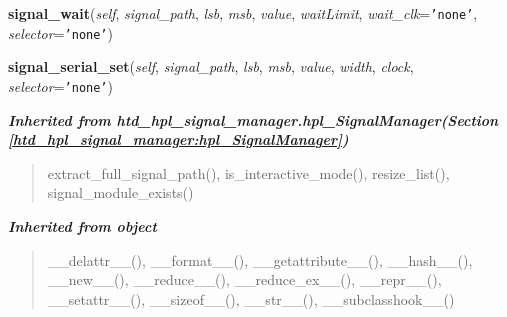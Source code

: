     \vspace{0.5ex}

\hspace{.8\funcindent}\begin{boxedminipage}{\funcwidth}

    \raggedright \textbf{signal\_wait}(\textit{self}, \textit{signal\_path}, \textit{lsb}, \textit{msb}, \textit{value}, \textit{waitLimit}, \textit{wait\_clk}={\tt \texttt{'}\texttt{none}\texttt{'}}, \textit{selector}={\tt \texttt{'}\texttt{none}\texttt{'}})

\setlength{\parskip}{2ex}
\setlength{\parskip}{1ex}
    \end{boxedminipage}

    \label{htd_hpl_signal_manager:hpl_SignalManager_non_interactive:signal_serial_set}

    \vspace{0.5ex}

\hspace{.8\funcindent}\begin{boxedminipage}{\funcwidth}

    \raggedright \textbf{signal\_serial\_set}(\textit{self}, \textit{signal\_path}, \textit{lsb}, \textit{msb}, \textit{value}, \textit{width}, \textit{clock}, \textit{selector}={\tt \texttt{'}\texttt{none}\texttt{'}})

\setlength{\parskip}{2ex}
\setlength{\parskip}{1ex}
    \end{boxedminipage}


\large{\textbf{\textit{Inherited from htd\_hpl\_signal\_manager.hpl\_SignalManager\textit{(Section \ref{htd_hpl_signal_manager:hpl_SignalManager})}}}}

\begin{quote}
extract\_full\_signal\_path(), is\_interactive\_mode(), resize\_list(), signal\_module\_exists()
\end{quote}

\large{\textbf{\textit{Inherited from object}}}

\begin{quote}
\_\_delattr\_\_(), \_\_format\_\_(), \_\_getattribute\_\_(), \_\_hash\_\_(), \_\_new\_\_(), \_\_reduce\_\_(), \_\_reduce\_ex\_\_(), \_\_repr\_\_(), \_\_setattr\_\_(), \_\_sizeof\_\_(), \_\_str\_\_(), \_\_subclasshook\_\_()
\end{quote}

